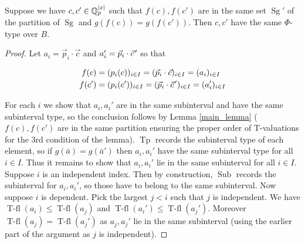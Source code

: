 \documentclass{amsart}
\DeclareMathOperator{\Sg}{Sg}
\DeclareMathOperator{\It}{Tp}
\DeclareMathOperator{\Sub}{Sub}
\DeclareMathOperator{\tfl}{T-fl}
\begin{document}
\begin{Lemma}
  Suppose we have $c, c' \in \mathbb{Q}_p^{|x|}$ such that $f(c), f(c')$ are in the same
  set $\Sg'$ of the partition of $\Sg$ and $g(f(c)) = g(f(c'))$.
  Then $c, c'$ have the same $\Phi$-type over $B$.
\end{Lemma}

\newcommand{\pvec}[1]{\vec{#1}\mkern2mu\vphantom{#1}}

\begin{proof}
  Let $a_i = \vec p_i \cdot \vec c$ and $a_i' = \vec p_i \cdot \pvec c'$ so that

  \begin{align*}
    f(c) &= (p_i(c))_{i \in I} = (\vec p_i \cdot \vec c)_{i \in I} = (a_i)_{i \in I} \\
    f(c') &= (p_i(c'))_{i \in I} = (\vec p_i \cdot \pvec c')_{i \in I} = (a_i')_{i \in I}
  \end{align*}

  For each $i$ we show that $a_i, a_i'$ are in the same subinterval and have the same subinterval type, so the conclusion follows by Lemma \ref{main_lemma}
  ($f(c), f(c')$ are in the same partition ensuring the proper order of T-valuations for the 3rd condition of the lemma).
  $\It$ records the subinterval type of each element, so if $g(\bar a) = g(\bar a')$ then $a_i, a_i'$ have the same subinterval type for all $i \in I$.
  Thus it remains to show that $a_i, a_i'$ lie in the same subinterval for all $i \in I$.
  Suppose $i$ is an independent index.
  Then by construction, $\Sub$ records the subinterval for $a_i, a_i'$, so those have to belong to the same subinterval.
  Now suppose $i$ is dependent.
  Pick the largest $j < i$ such that $j$ is independent.
  We have $\tfl(a_i) \leq \tfl(a_j)$ and $\tfl(a_i') \leq \tfl(a_j')$.
  Moreover $\tfl(a_j) = \tfl(a_j')$ as $a_j, a_j'$ lie in the same subinterval (using the earlier part of the argument as $j$ is independent).
  

\end{proof}
\end{document}
